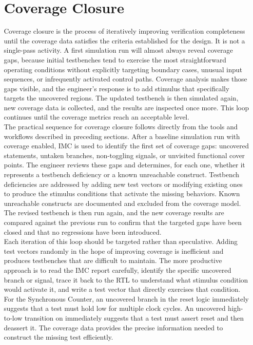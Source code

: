 \section{Coverage Closure}
\label{sec:coverage-closure}

Coverage closure is the process of iteratively improving verification completeness until the coverage data satisfies the criteria established for the design. It is not a single-pass activity. A first simulation run will almost always reveal coverage gaps, because initial testbenches tend to exercise the most straightforward operating conditions without explicitly targeting boundary cases, unusual input sequences, or infrequently activated control paths. Coverage analysis makes those gaps visible, and the engineer's response is to add stimulus that specifically targets the uncovered regions. The updated testbench is then simulated again, new coverage data is collected, and the results are inspected once more. This loop continues until the coverage metrics reach an acceptable level.\\

The practical sequence for coverage closure follows directly from the tools and workflows described in preceding sections. After a baseline simulation run with coverage enabled, IMC is used to identify the first set of coverage gaps: uncovered statements, untaken branches, non-toggling signals, or unvisited functional cover points. The engineer reviews these gaps and determines, for each one, whether it represents a testbench deficiency or a known unreachable construct. Testbench deficiencies are addressed by adding new test vectors or modifying existing ones to produce the stimulus conditions that activate the missing behaviors. Known unreachable constructs are documented and excluded from the coverage model. The revised testbench is then run again, and the new coverage results are compared against the previous run to confirm that the targeted gaps have been closed and that no regressions have been introduced.\\

Each iteration of this loop should be targeted rather than speculative. Adding test vectors randomly in the hope of improving coverage is inefficient and produces testbenches that are difficult to maintain. The more productive approach is to read the IMC report carefully, identify the specific uncovered branch or signal, trace it back to the RTL to understand what stimulus condition would activate it, and write a test vector that directly exercises that condition. For the Synchronous Counter, an uncovered  branch in the reset logic immediately suggests that a test must hold  low for multiple clock cycles. An uncovered high-to-low transition on  immediately suggests that a test must assert reset and then deassert it. The coverage data provides the precise information needed to construct the missing test efficiently.\\

